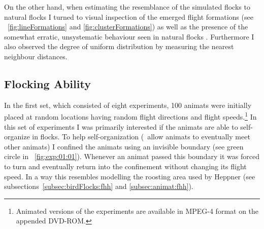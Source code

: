 On the other hand, when estimating the resemblance of the simulated flocks to natural flocks I turned to visual inspection of the emerged flight formations (see \figs~\ref{fig:lineFormations} and \ref{fig:clusterFormations}) as well as the presence of the somewhat erratic, unsystematic behaviour seen in natural flocks \cite{heppner:1990}.  Furthermore I also observed the degree of uniform distribution by measuring the nearest neighbour distances. 

\subsection{Flocking Ability}
In the first set, which consisted of eight experiments, 100 animats were initially placed at random locations having random flight directions and flight speeds.\footnote{Animated versions of the experiments are available in MPEG-4 format on the appended DVD-ROM.} In this set of experiments I was primarily interested if the animats are able to self-organize in flocks. To help self-organization (\ie\ allow animats to eventually meet other animats) I confined the animats using an invisible boundary (see green circle in \fig~\ref{fig:exp:01:01}). Whenever an animat passed this boundary it was forced to turn and eventually return into the confinement without changing its flight speed. In a way this resembles modelling the roosting area used by Heppner  \cite{heppner:1990} (see subsections~\ref{subsec:birdFlocks:fhh} and \ref{subsec:animat:fhh}). 

